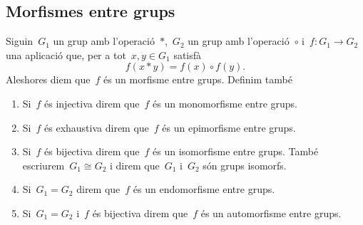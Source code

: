 \documentclass[../../main.tex]{subfiles}
\begin{document}
	\subsection{Morfismes entre grups}
	\begin{definition}
		\label{def:morfisme entre grups}
		\label{def:monomorfisme entre grups}
		\label{def:epimorfisme entre grups}
		\label{def:isomorfisme entre grups}
		\label{def:endomorfisme entre grups}
		\label{def:automorfisme entre grups}
		Siguin~\(G_{1}\) un grup amb l'operació~\(\ast\),~\(G_{2}\) un grup amb l'operació~\(\circ\) i~\(f\colon G_{1}\to G_{2}\) una aplicació que, per a tot~\(x,y\in G_{1}\) satisfà
		\[
		    f(x\ast y)=f(x)\circ f(y).
		\]
		Aleshores diem que~\(f\) és un morfisme entre grups.
		Definim també
		\begin{enumerate}
			\item Si~\(f\) és injectiva direm que~\(f\) és un monomorfisme entre grups.
			\item Si~\(f\) és exhaustiva direm que~\(f\) és un epimorfisme entre grups.
			\item Si~\(f\) és bijectiva direm que~\(f\) és un isomorfisme entre grups.
			També escriurem~\(G_{1}\cong G_{2}\) i direm que~\(G_{1}\) i~\(G_{2}\) són grups isomorfs.
			\item Si~\(G_{1}=G_{2}\) direm que~\(f\) és un endomorfisme entre grups.
			\item Si~\(G_{1}=G_{2}\) i~\(f\) és bijectiva direm que~\(f\) és un automorfisme entre grups.
		\end{enumerate}
	\end{definition}
\end{document}
